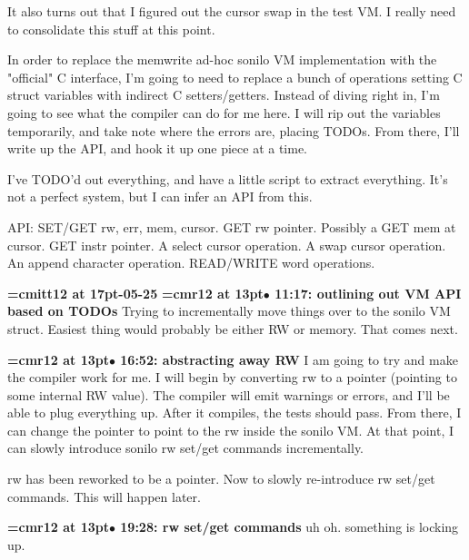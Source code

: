 It also turns out that I figured out the cursor swap in the test VM. I really need to consolidate this stuff at this point.
\par

In order to replace the memwrite ad-hoc sonilo VM implementation with the "official" C interface, I'm going to need to replace a bunch of operations setting C struct variables with indirect C setters/getters. Instead of diving right in, I'm going to see what the compiler can do for me here. I will rip out the variables temporarily, and take note where the errors are, placing TODOs. From there, I'll write up the API, and hook it up one piece at a time.
\par

I've TODO'd out everything, and have a little script to extract everything. It's not a perfect system, but I can infer an API from this.
\par

API: SET/GET rw, err, mem, cursor. GET rw pointer. Possibly a GET mem at cursor. GET instr pointer. A select cursor operation. A swap cursor operation. An append character operation. READ/WRITE word operations.
\par

{\medskip\noindent\bf\font\titlefont=cmitt12 at 17pt-05-25}\medskip
{\smallskip\noindent\bf\font\titlefont=cmr12 at 13pt\titlefont $\bullet$ 11:17: outlining out VM API based on TODOs}\smallskip
Trying to incrementally move things over to the sonilo VM struct. Easiest thing would probably be either RW or memory. That comes next.
\par

{\smallskip\noindent\bf\font\titlefont=cmr12 at 13pt\titlefont $\bullet$ 16:52: abstracting away RW}\smallskip
I am going to try and make the compiler work for me. I will begin by converting rw to a pointer (pointing to some internal RW value). The compiler will emit warnings or errors, and I'll be able to plug everything up. After it compiles, the tests should pass. From there, I can change the pointer to point to the rw inside the sonilo VM. At that point, I can slowly introduce sonilo rw set/get commands incrementally.
\par

rw has been reworked to be a pointer. Now to slowly re-introduce rw set/get commands. This will happen later.
\par

{\smallskip\noindent\bf\font\titlefont=cmr12 at 13pt\titlefont $\bullet$ 19:28: rw set/get commands}\smallskip
uh oh. something is locking up.
\par

